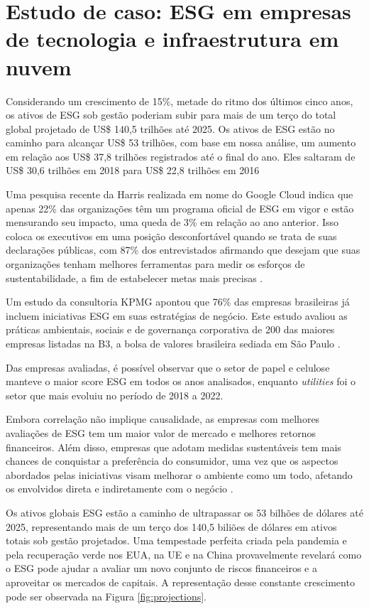 \documentclass[12pt]{article}
\begin{document}
	\section*{Estudo de caso: ESG em empresas de tecnologia e infraestrutura em nuvem}
	
	Considerando um crescimento de 15\%, metade do ritmo dos últimos cinco anos, os ativos de ESG sob gestão poderiam subir para mais de um terço do total global projetado de US\$ 140,5 trilhões até 2025. Os ativos de ESG estão no caminho para alcançar US\$ 53 trilhões, com base em nossa análise, um aumento em relação aos US\$ 37,8 trilhões registrados até o final do ano. Eles saltaram de US\$ 30,6 trilhões em 2018 para US\$ 22,8 trilhões em 2016 \cite{bloombergprofessionalservicesESGAssetsMay2021}
	
	Uma pesquisa recente da Harris realizada em nome do Google Cloud indica que apenas 22\% das organizações têm um programa oficial de ESG em vigor e estão mensurando seu impacto, uma queda de 3\% em relação ao ano anterior. Isso coloca os executivos em uma posição desconfortável quando se trata de suas declarações públicas, com 87\% dos entrevistados afirmando que desejam que suas organizações tenham melhores ferramentas para medir os esforços de sustentabilidade, a fim de estabelecer metas mais precisas \cite{googlecloudUnderstandingHowYour2023}.
	
	Um estudo da consultoria KPMG apontou que 76\% das empresas brasileiras já incluem iniciativas ESG em suas estratégias de negócio. Este estudo avaliou as práticas ambientais, sociais e de governança corporativa de 200 das maiores empresas listadas na B3, a bolsa de valores brasileira sediada em São Paulo \cite{deKPMGESGYearbook2023}.
	
	Das empresas avaliadas, é possível observar que o setor de papel e celulose manteve o maior score ESG em todos os anos analisados, enquanto \emph{utilities} foi o setor que mais evoluiu no período de 2018 a 2022.
	

	
	Embora correlação não implique causalidade, as empresas com melhores avaliações de ESG tem um maior valor de mercado e melhores retornos financeiros. Além disso, empresas que adotam medidas sustentáveis tem mais chances de conquistar a preferência do consumidor, uma vez que os aspectos abordados pelas iniciativas visam melhorar o ambiente como um todo, afetando os envolvidos direta e indiretamente com o negócio \cite{cabralPraticasESGAplicadas2023}.
	
	
	Os ativos globais ESG estão a caminho de ultrapassar os 53 bilhões de dólares até 2025, representando mais de um terço dos 140,5 biliões de dólares em ativos totais sob gestão projetados. Uma tempestade perfeita criada pela pandemia e pela recuperação verde nos EUA, na UE e na China provavelmente revelará como o ESG pode ajudar a avaliar um novo conjunto de riscos financeiros e a aproveitar os mercados de capitais. A representação desse constante crescimento pode ser observada na Figura \ref{fig:projections}.
	
\end{document}
